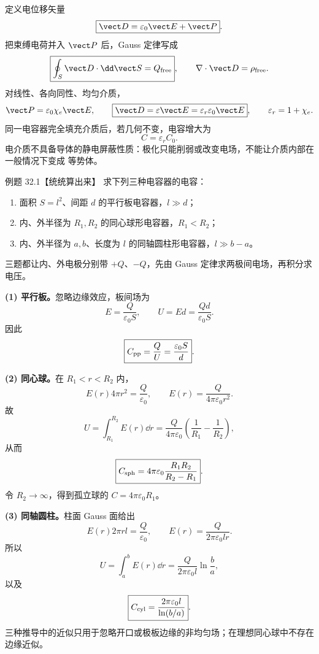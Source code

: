 定义电位移矢量
\begin{equation}
  \boxed{\vect D=\varepsilon_0\vect E+\vect P}.
\end{equation}
把束缚电荷并入 $\vect P$ 后，Gauss 定律写成
\begin{equation}
  \boxed{\oint_S\vect D\cdot\dd\vect S=Q_{\rm free}},
  \qquad \nabla\cdot\vect D=\rho_{\rm free}.
\end{equation}
对线性、各向同性、均匀介质，
\begin{equation}
  \vect P=\varepsilon_0\chi_e\vect E,
  \qquad
  \boxed{\vect D=\varepsilon\vect E
  =\varepsilon_r\varepsilon_0\vect E},
  \qquad \varepsilon_r=1+\chi_e.
\end{equation}
同一电容器完全填充介质后，若几何不变，电容增大为
\begin{equation}
  \boxed{C=\varepsilon_rC_0}.
\end{equation}
电介质不具备导体的静电屏蔽性质：极化只能削弱或改变电场，不能让介质内部在一般情况下变成
等势体。

\fi

\Needspace{0.42\textheight}
\begin{origexamplebox}{例题 32.1【统统算出来】}
求下列三种电容器的电容：
\begin{enumerate}[label=(\arabic*),leftmargin=2.2em]
  \item 面积 $S=l^2$、间距 $d$ 的平行板电容器，$l\gg d$；
  \item 内、外半径为 $R_1,R_2$ 的同心球形电容器，$R_1<R_2$；
  \item 内、外半径为 $a,b$、长度为 $l$ 的同轴圆柱形电容器，$l\gg b-a$。
\end{enumerate}
\end{origexamplebox}

\begin{xesolution}
三题都让内、外电极分别带 $+Q$、$-Q$，先由 Gauss 定律求两极间电场，再积分求电压。

\textbf{(1) 平行板。}忽略边缘效应，板间场为
\[
  E=\frac{Q}{\varepsilon_0S},\qquad
  U=Ed=\frac{Qd}{\varepsilon_0S}.
\]
因此
\begin{equation}
  \boxed{C_{\rm pp}=\frac QU=\frac{\varepsilon_0S}{d}}.
\end{equation}

\textbf{(2) 同心球。}在 $R_1<r<R_2$ 内，
\[
  E(r)4\pi r^2=\frac Q{\varepsilon_0},
  \qquad E(r)=\frac{Q}{4\pi\varepsilon_0r^2}.
\]
故
\[
  U=\int_{R_1}^{R_2}E(r)\dd r
  =\frac{Q}{4\pi\varepsilon_0}\left(\frac1{R_1}-\frac1{R_2}\right),
\]
从而
\begin{equation}
  \boxed{C_{\rm sph}=4\pi\varepsilon_0
  \frac{R_1R_2}{R_2-R_1}}.
\end{equation}
令 $R_2\to\infty$，得到孤立球的 $C=4\pi\varepsilon_0R_1$。

\textbf{(3) 同轴圆柱。}柱面 Gauss 面给出
\[
  E(r)2\pi rl=\frac Q{\varepsilon_0},
  \qquad E(r)=\frac{Q}{2\pi\varepsilon_0lr}.
\]
所以
\[
  U=\int_a^bE(r)\dd r=\frac{Q}{2\pi\varepsilon_0l}\ln\frac ba,
\]
以及
\begin{equation}
  \boxed{C_{\rm cyl}=\frac{2\pi\varepsilon_0l}{\ln(b/a)}}.
\end{equation}
三种推导中的近似只用于忽略开口或极板边缘的非均匀场；在理想同心球中不存在边缘近似。
\end{xesolution}

